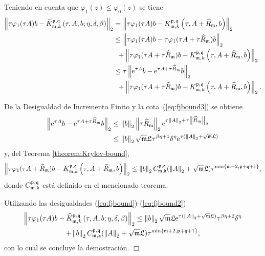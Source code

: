 Teniendo en cuenta que $\varphi_1(z) \leq \varphi_0(z)$ se tiene
\begin{align}
	\left\lVert \tau \varphi_1(\tau A)b -\widehat{K}_{\mathfrak{m},k}^{\mathfrak{p},\mathfrak{q}}\left( \tau, A , b; \eta, \delta, \beta \right) \right\rVert_2 & = \left\lVert \tau \varphi_1(\tau A)b -K_{\mathfrak{m},k}^{\mathfrak{p},\mathfrak{q}}\left( \tau, A+\widehat{R}_{\mathfrak{m}} , b \right) \right\rVert_2 \nonumber \\
	& \leq \left\lVert \tau \varphi_1(\tau A)b - \tau \varphi_1(\tau A + \tau \widehat{R}_{\mathfrak{m}})b \right\rVert_2 \nonumber \\
	& \enspace + \left\lVert \tau \varphi_1(\tau A + \tau \widehat{R}_{\mathfrak{m}})b-K_{\mathfrak{m},k}^{\mathfrak{p},\mathfrak{q}}\left( \tau, A+\widehat{R}_{\mathfrak{m}} , b \right) \right\rVert_2 \nonumber\\
	& \leq \tau \left\lVert \mathrm{e}^{\tau A}b - \mathrm{e}^{\tau A + \tau \widehat{R}_{\mathfrak{m}}}b \right\rVert_2 \nonumber \\
	& \enspace + \left\lVert \tau \varphi_1(\tau A + \tau \widehat{R}_{\mathfrak{m}})b-K_{\mathfrak{m},k}^{\mathfrak{p},\mathfrak{q}}\left( \tau, A+\widehat{R}_{\mathfrak{m}} , b \right) \right\rVert_2. \label{eq:fjbound}
\end{align}

De la Desigualdad de Incremento Finito y la cota~(\ref{eq:fjbound3}) se obtiene
\begin{align}
	\left\lVert \mathrm{e}^{\tau A}b - \mathrm{e}^{\tau A + \tau \widehat{R}_{\mathfrak{m}}}b \right\rVert_2&\leq \left\lVert b \right\rVert_2 \left\lVert \tau \widehat{R}_{\mathfrak{m}} \right\rVert_2\mathrm{e}^{\tau\left\lVert A \right\rVert_2+\tau\left\lVert \widehat{R}_{\mathfrak{m}} \right\rVert_2} \\ &\leq \left\lVert b \right\rVert_2   \sqrt{\mathfrak{m}}\mathfrak{L} \tau^{\beta\eta+1}\delta^\eta\mathrm{e}^{\tau(\left\lVert A \right\rVert_2+\sqrt{\mathfrak{m}}\mathfrak{L})} \nonumber\label{eq:fjbound1}
\end{align}
y, del Teorema \ref{theorem:Krylov-bound}, 
\vspace{-0.25cm}
\begin{equation}
	\left\lVert \tau \varphi_1(\tau A+\widehat{R}_{\mathfrak{m}})b-K_{\mathfrak{m},k}^{\mathfrak{p},\mathfrak{q}}\left( \tau, A+\widehat{R}_{\mathfrak{m}} , b \right) \right\rVert_2  \leq \left\lVert b \right\rVert_2C_{\mathfrak{m},\mathtt{k}}^{\mathfrak{p},\mathfrak{q}}(\left\lVert A \right\rVert_2+\sqrt{\mathfrak{m}}\mathfrak{L})\tau^{\min\{\mathfrak{m}+2,\mathfrak{p}+\mathfrak{q}+1\}}, \label{eq:fjbound2}
\end{equation}
donde $C_{\mathfrak{m},\mathtt{k}}^{\mathfrak{p},\mathfrak{q}}$ está definido en el mencionado teorema.

Utilizando las desigualdades (\ref{eq:fjbound})-(\ref{eq:fjbound2})
\vspace{-0.25cm}
\begin{multline*}
	\left\lVert \tau \varphi_1(\tau A)b -\widehat{K}_{\mathfrak{m},k}^{\mathfrak{p},\mathfrak{q}}\left( \tau, A , b; \eta, \delta, \beta \right) \right\rVert_2 \leq 
	\left\lVert b \right\rVert_2 \sqrt{\mathfrak{m}}\mathfrak{L} \mathrm{e}^{\tau(\left\lVert A \right\rVert_2+\sqrt{\mathfrak{m}}\mathfrak{L})} \tau^{\beta\eta+2}\delta^\eta \\ + \left\lVert b \right\rVert_2C_{\mathfrak{m},\mathtt{k}}^{\mathfrak{p},\mathfrak{q}}(\left\lVert A \right\rVert_2+\sqrt{\mathfrak{m}}\mathfrak{L})\tau^{\min\{\mathfrak{m}+2,\mathfrak{p}+\mathfrak{q}+1\}} ,
\end{multline*}
con lo cual se concluye la demostración. $\Box$\\

